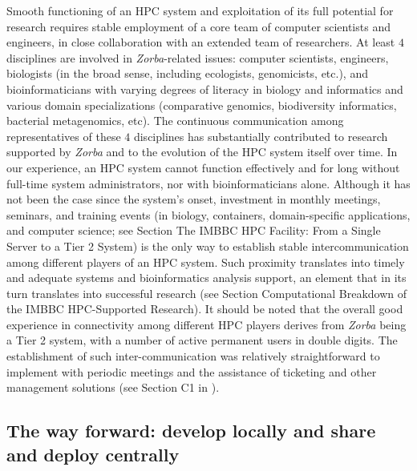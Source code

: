    Smooth functioning of an HPC system and exploitation of its full potential for research requires stable employment of a core team of computer scientists and engineers, in close collaboration with an extended team of researchers. 
   At least $4$ disciplines are involved in \textit{Zorba}-related issues: 
   computer scientists, engineers, biologists (in the broad sense, including ecologists, genomicists, etc.), and bioinformaticians with varying degrees of literacy in biology and informatics and various domain specializations (comparative genomics, biodiversity informatics, bacterial metagenomics, etc). 
   The continuous communication among representatives of these $4$ disciplines has substantially contributed to research supported by \textit{Zorba} and to the evolution of the HPC system itself over time. 
   In our experience, an HPC system cannot function effectively and for long without full-time system administrators, nor with bioinformaticians alone. 
   Although it has not been the case since the system's onset, investment in monthly meetings, seminars, and training events (in biology, containers, domain-specific applications, and computer science; see Section The IMBBC HPC Facility: From a Single Server to a Tier 2 System) is the only way to establish stable intercommunication among different players of an HPC system. 
   Such proximity translates into timely and adequate systems and bioinformatics analysis support, an element that in its turn translates into successful research (see Section Computational Breakdown of the IMBBC HPC-Supported Research). 
   It should be noted that the overall good experience in connectivity among different HPC players derives from \textit{Zorba} being a Tier 2 system, with a number of active permanent users in double digits. The establishment of such inter-communication was relatively straightforward to implement with periodic meetings and the assistance of ticketing and other management solutions (see Section C1 in \citep{haris_zafeiropoulos_2021_4665308}).


   \subsection*{The way forward: develop locally and share and deploy centrally}
   
